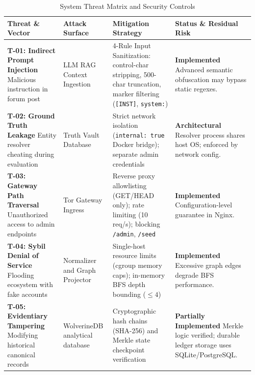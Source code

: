 \begin{table}[htbp]
\centering
\small
\caption{System Threat Matrix and Security Controls}
\label{tab:threat-matrix}
\begin{tabular}{@{}p{3.2cm}p{3cm}p{4.2cm}p{3.8cm}@{}}
\toprule
\textbf{Threat \& Vector} & \textbf{Attack Surface} & \textbf{Mitigation Strategy} & \textbf{Status \& Residual Risk} \\ \midrule
\textbf{T-01: Indirect Prompt Injection} \newline Malicious instruction in forum post & LLM RAG Context Ingestion & 4-Rule Input Sanitization: control-char stripping, 500-char truncation, marker filtering (\texttt{[INST]}, \texttt{system:}) & \textbf{Implemented} \newline Advanced semantic obfuscation may bypass static regexes. \\ \addlinespace
\textbf{T-02: Ground Truth Leakage} \newline Entity resolver cheating during evaluation & Truth Vault Database & Strict network isolation (\texttt{internal: true} Docker bridge); separate admin credentials & \textbf{Architectural} \newline Resolver process shares host OS; enforced by network config. \\ \addlinespace
\textbf{T-03: Gateway Path Traversal} \newline Unauthorized access to admin endpoints & Tor Gateway Ingress & Reverse proxy allowlisting (GET/HEAD only); rate limiting (10 req/s); blocking \texttt{/admin}, \texttt{/seed} & \textbf{Implemented} \newline Configuration-level guarantee in Nginx. \\ \addlinespace
\textbf{T-04: Sybil Denial of Service} \newline Flooding ecosystem with fake accounts & Normalizer and Graph Projector & Single-host resource limits (cgroup memory caps); in-memory BFS depth bounding ($\le 4$) & \textbf{Implemented} \newline Excessive graph edges degrade BFS performance. \\ \addlinespace
\textbf{T-05: Evidentiary Tampering} \newline Modifying historical canonical records & WolverineDB analytical database & Cryptographic hash chains (SHA-256) and Merkle state checkpoint verification & \textbf{Partially Implemented} \newline Merkle logic verified; durable ledger storage uses SQLite/PostgreSQL. \\ \bottomrule
\end{tabular}
\end{table}

